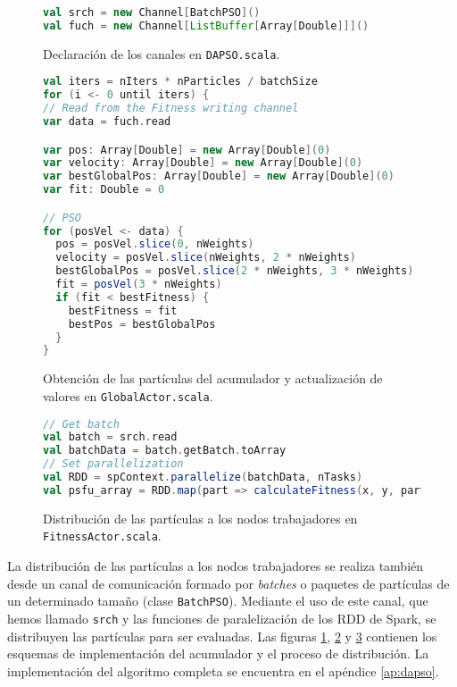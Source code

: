 \begin{figure}[ht!]
    \centering
    \begin{lstlisting}[language=Scala, caption={}]
val srch = new Channel[BatchPSO]()
val fuch = new Channel[ListBuffer[Array[Double]]]()
    \end{lstlisting}
    \caption{Declaración de los canales en \texttt{DAPSO.scala}.}
    \label{fig:dapso-impl-1}
\end{figure}
\begin{figure}[ht!]
    \centering
    \begin{lstlisting}[language=Scala]
val iters = nIters * nParticles / batchSize
for (i <- 0 until iters) {
// Read from the Fitness writing channel
var data = fuch.read

var pos: Array[Double] = new Array[Double](0)
var velocity: Array[Double] = new Array[Double](0)
var bestGlobalPos: Array[Double] = new Array[Double](0)
var fit: Double = 0

// PSO
for (posVel <- data) {
  pos = posVel.slice(0, nWeights)
  velocity = posVel.slice(nWeights, 2 * nWeights)
  bestGlobalPos = posVel.slice(2 * nWeights, 3 * nWeights)
  fit = posVel(3 * nWeights)
  if (fit < bestFitness) {
    bestFitness = fit
    bestPos = bestGlobalPos
  }
}
    \end{lstlisting}
    \caption{Obtención de las partículas del acumulador y actualización de valores en \texttt{GlobalActor.scala}.}
    \label{fig:dapso-impl-2}
\end{figure}
\begin{figure}[ht!]
    \centering
    \begin{lstlisting}[language=Scala]
// Get batch
val batch = srch.read
val batchData = batch.getBatch.toArray
// Set parallelization
val RDD = spContext.parallelize(batchData, nTasks)
val psfu_array = RDD.map(part => calculateFitness(x, y, part, nInput, nHidden, isClas)).collect()
    \end{lstlisting}
    \caption{Distribución de las partículas a los nodos trabajadores en \texttt{FitnessActor.scala}.}
    \label{fig:dapso-impl-3}
\end{figure}

\vspace{10pt}
La distribución de las partículas a los nodos trabajadores se realiza también desde un canal de comunicación 
formado por \textit{batches} o paquetes de partículas de un determinado tamaño (clase \texttt{BatchPSO}). Mediante 
el uso de este canal, que hemos llamado \texttt{srch} y las funciones de paralelización de los RDD de Spark, se 
distribuyen las partículas para ser evaluadas. Las figuras \ref{fig:dapso-impl-1}, \ref{fig:dapso-impl-2} y 
\ref{fig:dapso-impl-3} contienen los esquemas de implementación del acumulador y el proceso de distribución. La 
implementación del algoritmo completa se encuentra en el apéndice \ref{ap:dapso}.

